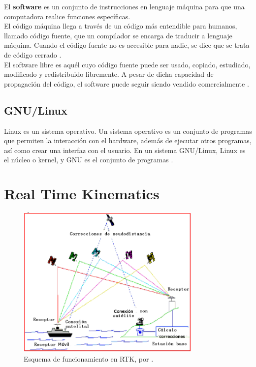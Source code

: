 El \textbf{software} es un conjunto de instrucciones en lenguaje máquina para que una computadora realice funciones específicas.\\

El código máquina llega a través de un código más entendible para humanos, llamado código fuente, que un compilador se encarga de traducir a lenguaje máquina. Cuando el código fuente no es accesible para nadie, se dice que se trata de código cerrado \citep{i2005software}.\\

El software libre es aquél cuyo código fuente puede ser usado, copiado, estudiado, modificado y redistribuido libremente. A pesar de dicha capacidad de propagación del código, el software puede seguir siendo vendido comercialmente \citep{garcia2007promocion}. 

\subsection{GNU/Linux}
Linux es un sistema operativo. Un sistema operativo es un conjunto de programas que permiten la interacción con el hardware, además de ejecutar otros programas, así como crear una interfaz con el usuario. En un sistema GNU/Linux, Linux es el núcleo o kernel, y GNU es el conjunto de programas \citep{debian}. 


\section{Real Time Kinematics}

\begin{figure}[H]
\centering
\includegraphics[width=0.8\textwidth]{Figures/DGPS1}
\caption[Esquema de funcionamiento en RTK.]{Esquema de funcionamiento en RTK, por \cite{fallas2002sistema}.}
\label{fig:RTK}
\end{figure}


